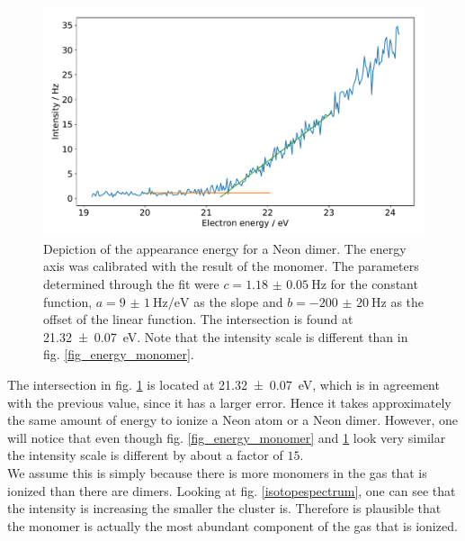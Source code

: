 \documentclass[a4paper,10pt]{article}
\begin{document}
\begin{figure}[H]
	\centering
	\includegraphics[width = 0.8 \textwidth]{energy_ne2.pdf}
	\caption{Depiction of the appearance energy for a Neon dimer. The energy axis was calibrated with the result of the monomer. The parameters determined through the fit were $c = \SI{1.18(5)}{\hertz}$ for the constant function, $a = \SI{9(1)}{\hertz \per \electronvolt}$ as the slope and $b = \SI{-200(20)}{\hertz}$ as the offset of the linear function. The intersection is found at \SI{21.32(7)}{\electronvolt}. Note that the intensity scale is different than in fig. \ref{fig_energy_monomer}. }
	\label{fig_energy_dimer}
\end{figure}
The intersection in fig. \ref{fig_energy_dimer} is located at \SI{21.32(7)}{\electronvolt}, which is in agreement with the previous value, since it has a larger error. Hence it takes approximately the same amount of energy to ionize a Neon atom or a Neon dimer. However, one will notice that even though fig. \ref{fig_energy_monomer} and \ref{fig_energy_dimer} look very similar the intensity scale is different by about a factor of $15$. \\
We assume this is simply because there is more monomers in the gas that is ionized than there are dimers. Looking at fig. \ref{isotopespectrum}, one can see that the intensity is increasing the smaller the cluster is. Therefore is plausible that the monomer is actually the most abundant component of the gas that is ionized.
\end{document}
